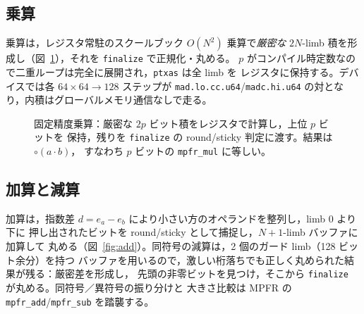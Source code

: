 \documentclass[uplatex,dvipdfmx,a4paper,11pt]{jsarticle}
\newcommand{\code}[1]{\texttt{#1}}
\newcommand{\PB}{\ensuremath{p}}
\newcommand{\Nlimb}{\ensuremath{N}}
\newcommand{\round}{\ensuremath{\circ}}
\begin{document}
\subsection{乗算}
\label{sec:freal-mul}

乗算は，レジスタ常駐のスクールブック $O(\Nlimb^2)$ 乗算で\emph{厳密な}
$2\Nlimb$-limb 積を形成し（図~\ref{fig:mul}），それを \code{finalize} で正規化・丸める。
\PB{} がコンパイル時定数なので二重ループは完全に展開され，\code{ptxas} は全 limb を
レジスタに保持する。デバイスでは各 $64\times64\to128$ ステップが
\code{mad.lo.cc.u64}/\code{madc.hi.u64} の対となり，内積はグローバルメモリ通信なしで走る。

\begin{figure}[h]
\centering
{}
\caption{固定精度乗算：厳密な $2\PB$ ビット積をレジスタで計算し，上位 \PB{} ビットを
保持，残りを \code{finalize} の round/sticky 判定に渡す。結果は $\round(a\cdot b)$，
すなわち \PB{} ビットの \code{mpfr\_mul} に等しい。}
\label{fig:mul}
\end{figure}

\subsection{加算と減算}
\label{sec:freal-add}

加算は，指数差 $d=e_a-e_b$ により小さい方のオペランドを整列し，limb $0$ より下に
押し出されたビットを round/sticky として捕捉し，$\Nlimb{+}1$-limb バッファに加算して
丸める（図~\ref{fig:add}）。同符号の減算は，2 個のガード limb（128 ビット余分）を持つ
バッファを用いるので，激しい桁落ちでも正しく丸められた結果が残る：厳密差を形成し，
先頭の非零ビットを見つけ，そこから \code{finalize} が丸める。同符号／異符号の振り分けと
大きさ比較は MPFR の \code{mpfr\_add}/\code{mpfr\_sub} を踏襲する。
\end{document}
